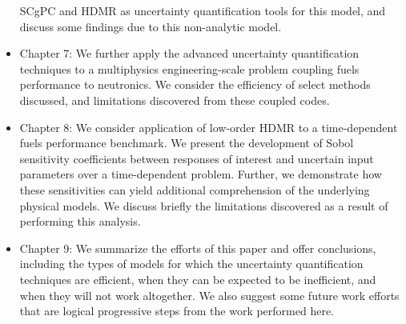\begin{itemize}
    SCgPC and HDMR as uncertainty
    quantification tools for this model, and discuss some findings due to this non-analytic model. 
  \item Chapter 7: We further apply the advanced uncertainty quantification techniques to a multiphysics
    engineering-scale problem coupling fuels performance to neutronics.  We consider the efficiency of select
    methods discussed, and limitations discovered from these coupled codes.
  \item Chapter 8: We consider application of low-order HDMR to a time-dependent fuels
    performance benchmark.  We present the development of Sobol sensitivity coefficients between responses of
    interest and uncertain input parameters over a time-dependent problem.  Further, we demonstrate how these
    sensitivities can yield additional comprehension of the underlying physical models.  We discuss briefly
    the limitations discovered as a result of performing this analysis.
  \item Chapter 9: We summarize the efforts of this paper and offer conclusions, including the types of models
    for which the uncertainty quantification techniques are efficient, when they can be expected to be
    inefficient, and when they will not work altogether.  We also suggest some future work efforts that are logical
    progressive steps from the work performed here.
\end{itemize}
